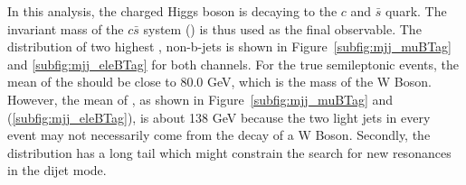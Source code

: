 
In this analysis, the charged Higgs boson is decaying to the $c$ and $\bar{s}$ 
quark. The invariant mass of the $c\bar{s}$ system (\mjj) is thus used as the 
final observable. The \mjj distribution of two highest \pt, non-b-jets is
shown in Figure~\ref{subfig:mjj_muBTag} and \ref{subfig:mjj_eleBTag} for
both channels. For the true semileptonic \ttbar events, the mean of the \mjj 
should be close to 80.0 GeV, which is the mass of the W Boson. However, the mean of
\mjj, as shown in Figure~\ref{subfig:mjj_muBTag} and (\ref{subfig:mjj_eleBTag}),
is about 138 GeV because the two light jets in every event may not necessarily 
come from the decay of a W Boson. Secondly, the \mjj distribution has a long tail 
which might constrain the search for new resonances in the dijet mode. 
\begin{figure}
    \centering
    \vfil

\end{figure}
